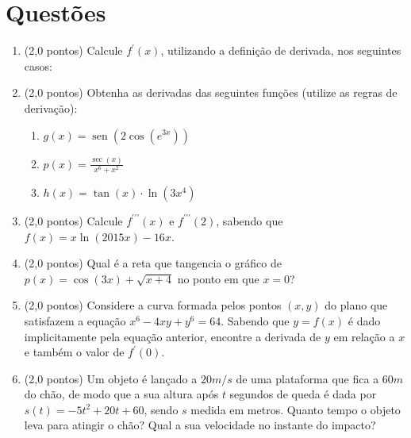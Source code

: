 \documentclass[12pt,a4paper]{article}
\begin{document}
\section*{Questões}
\begin{enumerate}
\item (2,0 pontos) Calcule $f^\prime(x)$, utilizando a definição de derivada, nos seguintes casos:
\begin{enumerate}
\end{enumerate}

\item (2,0 pontos) Obtenha as derivadas das seguintes funções (utilize as regras de derivação):
\begin{multicols}{3}
\begin{enumerate}
\item $g(x) = \operatorname{sen}{ ( 2 \cos( e^{3x} ) ) }$
\item $p(x) = \frac{\sec({x})}{x^6 + x^2}$
\item $h(x) = \tan(x) \cdot \ln(3x^4)$
\end{enumerate}
\end{multicols}

\item (2,0 pontos) Calcule $f^{\prime\prime\prime}(x)$ e $f^{\prime\prime\prime}(2)$, sabendo que $f(x) = x \ln( 2015x ) - 16x$.

\item (2,0 pontos) Qual é a reta que tangencia o gráfico de $p(x) = \cos(3x) + \sqrt{x + 4}$ no ponto em que $x = 0$?

\item (2,0 pontos) Considere a curva formada pelos pontos $(x,y)$ do plano que satisfazem a equação $x^6 - 4x y + y^6 = 64$. Sabendo que $y = f(x)$ é dado implicitamente pela equação anterior, encontre a derivada de $y$ em relação a $x$ e também o valor de $f^\prime(0)$.

\item (2,0 pontos) Um objeto é lançado a $20m/s$ de uma plataforma que fica a $60 m$ do chão, de modo que a sua altura após $t$ segundos de queda é dada por $s(t) = -5t^2 + 20t + 60$, sendo $s$ medida em metros. Quanto tempo o objeto leva para atingir o chão? Qual a sua velocidade no instante do impacto?
\end{enumerate}
\end{document}
